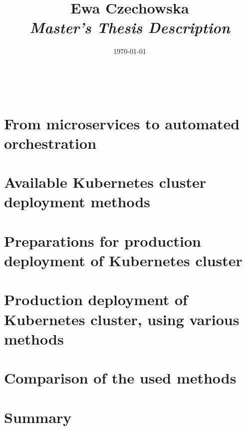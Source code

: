 \documentclass[12pt]{article}
\title{
{\small Ewa Czechowska } \\
\bf\textit{ Master’s Thesis Description } \\
\vspace{4cm}}
\date{\today}
\begin{document}
\maketitle
~\vspace{8cm}
\newpage

\tableofcontents
\newpage


\newpage

\section{From microservices to automated orchestration}


\newpage

\section{Available Kubernetes cluster deployment methods}
\newpage

\section{Preparations for production deployment of Kubernetes cluster}

\newpage

\section{Production deployment of Kubernetes cluster, using various methods}
\newpage

\section{Comparison of the used methods}
\newpage

\section{Summary}
\newpage

\printbibliography[type=book,title={Books only}]
\printbibliography[type=article,title={Articles only}]
\printbibliography[nottype=book,nottype=article,title={Other sources}]
\end{document}
